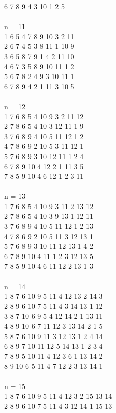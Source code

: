 {6 7 8 9 4 3 10 1 2 5\\
\\
n = 11\\
1 6 5 4 7 8 9 10 3 2 11 \\
2 6 7 4 5 3 8 11 1 10 9\\
3 6 5 8 7 9 1 4 2 11 10\\
4 6 7 3 5 8 9 10 11 1 2\\
5 6 7 8 2 4 9 3 10 11 1\\
6 7 8 9 4 2 1 11 3 10 5\\
\\
n = 12\\
1 7 6 8 5 4 10 9 3 2 11 12 \\
2 7 8 6 5 4 10 3 12 11 1 9\\
3 7 6 8 9 4 10 5 11 12 1 2\\
4 7 8 6 9 2 10 5 3 11 12 1\\
5 7 6 8 9 3 10 12 11 1 2 4\\
6 7 8 9 10 4 12 2 1 11 3 5\\
7 8 5 9 10 4 6 12 1 2 3 11\\
\\
n = 13\\
1 7 6 8 5 4 10 9 3 11 2 13 12\\
2 7 8 6 5 4 10 3 9 13 1 12 11\\
3 7 6 8 9 4 10 5 11 12 1 2 13 \\
4 7 8 6 9 2 10 5 11 3 12 13 1\\
5 7 6 8 9 3 10 11 12 13 1 4 2\\
6 7 8 9 10 4 11 1 2 3 12 13 5\\
7 8 5 9 10 4 6 11 12 2 13 1 3\\
\\
n = 14\\
1 8 7 6 10 9 5 11 4 12 13 2 14 3\\
2 8 9 6 10 7 5 11 4 3 14 13 1 12\\
3 8 7 10 6 9 5 4 12 14 2 1 13 11\\
4 8 9 10 6 7 11 12 3 13 14 2 1 5\\
5 8 7 6 10 9 11 3 12 13 1 2 4 14 \\
6 8 9 7 10 11 12 5 14 13 1 2 3 4\\
7 8 9 5 10 11 4 12 3 6 1 13 14 2\\
8 9 10 6 5 11 4 7 12 2 3 13 14 1\\
\\
n = 15\\
1 8 7 6 10 9 5 11 4 12 3 2 15 13 14\\
2 8 9 6 10 7 5 11 4 3 12 14 1 15 13\\
}
